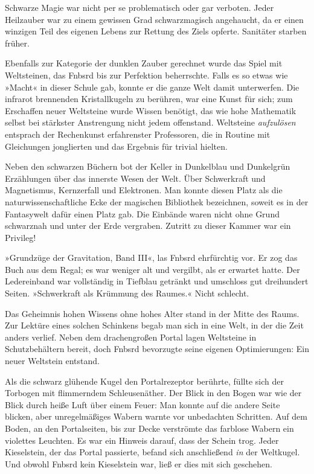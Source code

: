 Schwarze Magie war nicht per se problematisch oder gar verboten. Jeder Heilzauber war zu einem gewissen Grad schwarzmagisch angehaucht, da er einen winzigen Teil des eigenen Lebens zur Rettung des Ziels opferte. Sanitäter starben früher.

Ebenfalls zur Kategorie der dunklen Zauber gerechnet wurde das Spiel mit Weltsteinen, das Fnbsrd bis zur Perfektion beherrschte. Falls es so etwas wie »Macht« in dieser Schule gab, konnte er die ganze Welt damit unterwerfen. Die infrarot brennenden Kristallkugeln zu berühren, war eine Kunst für sich; zum Erschaffen neuer Weltsteine wurde Wissen benötigt, das wie hohe Mathematik selbst bei stärkster Anstrengung nicht jedem offenstand. Weltsteine \emph{aufzulösen} entsprach der Rechenkunst erfahrenster Professoren, die in Routine mit Gleichungen jonglierten und das Ergebnis für trivial hielten.

Neben den schwarzen Büchern bot der Keller in Dunkelblau und Dunkelgrün Erzählungen über das innerste Wesen der Welt. Über Schwerkraft und Magnetismus, Kernzerfall und Elektronen. Man konnte diesen Platz als die naturwissenschaftliche Ecke der magischen Bibliothek bezeichnen, soweit es in der Fantasywelt dafür einen Platz gab. Die Einbände waren nicht ohne Grund schwarznah und unter der Erde vergraben. Zutritt zu dieser Kammer war ein Privileg!

»Grundzüge der Gravitation, Band III«, las Fnbsrd ehrfürchtig vor. Er zog das Buch aus dem Regal; es war weniger alt und vergilbt, als er erwartet hatte. Der Ledereinband war vollständig in Tiefblau getränkt und umschloss gut dreihundert Seiten. »Schwerkraft als Krümmung des Raumes.« Nicht schlecht.

Das Geheimnis hohen Wissens ohne hohes Alter stand in der Mitte des Raums. Zur Lektüre eines solchen Schinkens begab man sich in eine Welt, in der die Zeit anders verlief. Neben dem drachengroßen Portal lagen Weltsteine in Schutzbehältern bereit, doch Fnbsrd bevorzugte seine eigenen Optimierungen: Ein neuer Weltstein entstand.

Als die schwarz glühende Kugel den Portalrezeptor berührte, füllte sich der Torbogen mit flimmerndem Schleusenäther. Der Blick in den Bogen war wie der Blick durch heiße Luft über einem Feuer: Man konnte auf die andere Seite blicken, aber unregelmäßiges Wabern warnte vor unbedachten Schritten. Auf dem Boden, an den Portalseiten, bis zur Decke verströmte das farblose Wabern ein violettes Leuchten. Es war ein Hinweis darauf, dass der Schein trog. Jeder Kieselstein, der das Portal passierte, befand sich anschließend \emph{in} der Weltkugel. Und obwohl Fnbsrd kein Kieselstein war, ließ er dies mit sich geschehen.


